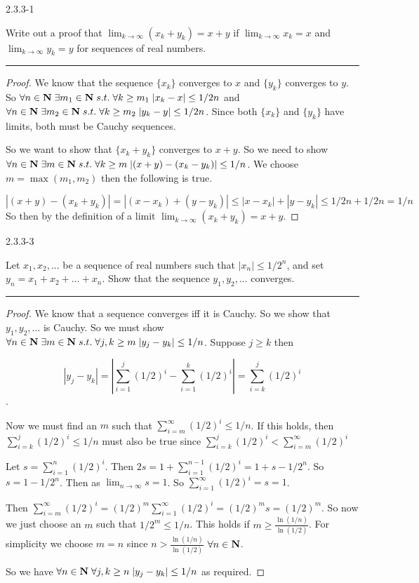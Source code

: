 \documentclass[11pt]{article}
\begin{document}
\newpage
{} 2.3.3-1

Write out a proof that $\lim_{k \to \infty} (x_k + y_k) = x + y$ if $\lim_{k \to \infty} x_k = x$ and $\lim_{k \to \infty} y_k = y$ for sequences of real numbers.
\hrule

\begin{proof}

We know that the sequence $\{x_k\}$ converges to $x$ and $\{y_k\}$ converges to $y$. So $\forall n \in \mathbf{N} \; \exists m_1 \in \mathbf{N} \; s.t. \; \forall k \geq m_1 \; |x_k - x| \leq 1/2n$ and $\forall n \in \mathbf{N} \; \exists m_2 \in \mathbf{N} \; s.t. \; \forall k \geq m_2 \; |y_k - y| \leq 1/2n$. Since both $\{x_k\}$ and $\{y_k\}$ have limits, both must be Cauchy sequences. 

So we want to show that $\{x_k + y_k\}$ converges to $x + y$. So we need to show $\forall n \in \mathbf{N} \; \exists m \in \mathbf{N} \; s.t. \; \forall k \geq m \; |(x + y) - (x_k - y_k)| \leq 1/n$.  We choose $m = \max(m_1, m_2)$ then the following is true.

$$|(x + y) - (x_k + y_k)| = |(x - x_k) + (y - y_k)| \leq |x - x_k| + |y - y_k| \leq 1/2n + 1/2n = 1/n$$
So then by the definition of a limit $\lim_{k \to \infty} (x_k + y_k) = x + y$. 

\end{proof}

\newpage
{} 2.3.3-3

Let $x_1, x_2, ...$ be a sequence of real numbers such that $|x_n| \leq 1/2^n$, and set $y_n = x_1 + x_2 + ... + x_n$. Show that the sequence $y_1, y_2, ...$ converges. 
\hrule

\begin{proof}

We know that a sequence converges iff it is Cauchy. So we show that $y_1, y_2, ...$ is Cauchy. So we must show $\forall n \in \mathbf{N} \; \exists m \in \mathbf{N} \; s.t. \; \forall j,k \geq m \; |y_j - y_k| \leq 1/n$. Suppose $j \geq k$ then 

$$|y_j - y_k| = \left|\sum_{i = 1} ^j (1/2)^i - \sum_{i = 1} ^k (1/2)^i \right| = \sum_{i = k} ^j (1/2)^i$$.

 Now we must find an $m$ such that $\sum_{i = m} ^ \infty (1/2)^i \leq 1/n$. If this holds, then $\sum_{i = k} ^j (1/2)^i \leq 1/n$ must also be true since $\sum_{i = k} ^j (1/2)^i < \sum_{i = m} ^\infty (1/2)^i$

Let $s = \sum_{i = 1} ^n (1/2)^i$. Then $2s = 1 + \sum_{i = 1} ^{n-1} (1/2)^i = 1 + s - 1/2^n$. So $s = 1 - 1/2^n$. Then as $\lim_{n \to \infty} s = 1$. So $\sum_{i = 1} ^\infty
 (1/2)^i = s = 1$. 
 
 Then $\sum_{i = m} ^ \infty (1/2)^i = (1/2)^m \sum_{i = 1} ^\infty (1/2)^i = (1/2)^m s = (1/2)^m$. So now we just choose an $m$ such that $1/2^m \leq 1/n$. This holds if $m \geq \frac{\ln(1/n)}{\ln(1/2)}$. For simplicity we choose $m = n$ since $n > \frac{\ln(1/n)}{\ln(1/2)}$ $\forall n \in \mathbf{N}$.
 
So we have $\forall n \in \mathbf{N} \; \forall j,k \geq n \; |y_j - y_k| \leq 1/n$ as required.

\end{proof}
\end{document}
